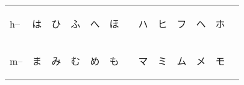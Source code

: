 \begin{table}[H]
\begin{tabular}{l|cccccc|cccccc}
		   h-- & {\begin{CJK}{UTF8}{min} は \end{CJK}} & {\begin{CJK}{UTF8}{min} ひ \end{CJK}} & {\begin{CJK}{UTF8}{min} ふ \end{CJK}} & {\begin{CJK}{UTF8}{min} へ \end{CJK}} & {\begin{CJK}{UTF8}{min} ほ \end{CJK}} &                                       & {\begin{CJK}{UTF8}{min} ハ \end{CJK}} & {\begin{CJK}{UTF8}{min} ヒ \end{CJK}} & {\begin{CJK}{UTF8}{min} フ \end{CJK}} & {\begin{CJK}{UTF8}{min} ヘ \end{CJK}} & {\begin{CJK}{UTF8}{min} ホ \end{CJK}} &                                      \\
           m-- & {\begin{CJK}{UTF8}{min} ま \end{CJK}} & {\begin{CJK}{UTF8}{min} み \end{CJK}} & {\begin{CJK}{UTF8}{min} む \end{CJK}} & {\begin{CJK}{UTF8}{min} め \end{CJK}} & {\begin{CJK}{UTF8}{min} も \end{CJK}} &                                       & {\begin{CJK}{UTF8}{min} マ \end{CJK}} & {\begin{CJK}{UTF8}{min} ミ \end{CJK}} & {\begin{CJK}{UTF8}{min} ム \end{CJK}} & {\begin{CJK}{UTF8}{min} メ \end{CJK}} & {\begin{CJK}{UTF8}{min} モ \end{CJK}} &                                      \\

\end{tabular}
\end{table}
